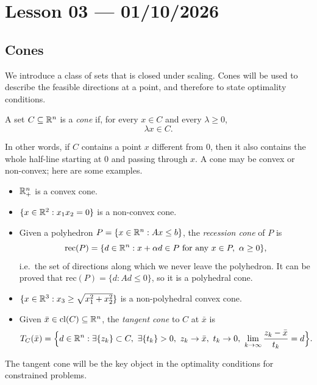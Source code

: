 \section{Lesson 03 --- 01/10/2026}

\subsection{Cones}

We introduce a class of sets that is closed under scaling. Cones will be used to describe the feasible directions at a point, and therefore to state optimality conditions.

\begin{definition}[Cone]
A set $C \subseteq \mathbb{R}^n$ is a \emph{cone} if, for every $x \in C$ and every $\lambda \ge 0$,
\[
    \lambda x \in C.
\]
\end{definition}

In other words, if $C$ contains a point $x$ different from $0$, then it also contains the whole half-line starting at $0$ and passing through $x$. A cone may be convex or non-convex; here are some examples.

\begin{example}
\leavevmode
\begin{itemize}
    \item $\mathbb{R}_+^n$ is a convex cone.
    \item $\{ x \in \mathbb{R}^2 : x_1 x_2 = 0\}$ is a non-convex cone.
    \item Given a polyhedron $P = \{x \in \mathbb{R}^n : Ax \le b\}$, the \emph{recession cone} of $P$ is
    \[
    \mathrm{rec}(P) = \{d \in \mathbb{R}^n : x+\alpha d \in P \text{ for any } x \in P,\ \alpha \ge 0\},
    \]
    i.e.\ the set of directions along which we never leave the polyhedron. It can be proved that $\mathrm{rec}(P) = \{d : Ad \le 0\}$, so it is a polyhedral cone.
    \item $\{x \in \mathbb{R}^3 : x_3 \ge \sqrt{x_1^2 + x_2^2}\}$ is a non-polyhedral convex cone.
    \item Given $\bar{x} \in \mathrm{cl}(C) \subseteq \mathbb{R}^n$, the \emph{tangent cone} to $C$ at $\bar{x}$ is
    \[
        T_C(\bar{x}) = \Big\{d \in \R^n : \exists \{z_k\} \subset C,\ \exists \{t_k\} > 0,\ z_k \to \bar{x},\ t_k \to 0,\ \lim_{k \to \infty} \frac{z_k - \bar{x}}{t_k} = d\Big\}.
    \]
\end{itemize}
\end{example}

The tangent cone will be the key object in the optimality conditions for constrained problems.

